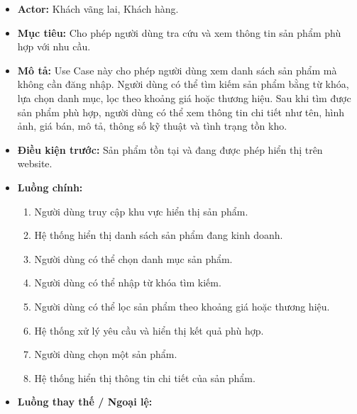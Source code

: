 \documentclass[12pt,a4paper]{article}
\begin{document}
\begin{itemize}

 \item \textbf{Actor:} Khách vãng lai, Khách hàng.

 \item \textbf{Mục tiêu:} Cho phép người dùng tra cứu và xem thông tin sản phẩm phù hợp với nhu cầu.

 \item \textbf{Mô tả:} Use Case này cho phép người dùng xem danh sách sản phẩm mà không cần đăng nhập. Người dùng có thể tìm kiếm sản phẩm bằng từ khóa, lựa chọn danh mục, lọc theo khoảng giá hoặc thương hiệu. Sau khi tìm được sản phẩm phù hợp, người dùng có thể xem thông tin chi tiết như tên, hình ảnh, giá bán, mô tả, thông số kỹ thuật và tình trạng tồn kho.

 \item \textbf{Điều kiện trước:} Sản phẩm tồn tại và đang được phép hiển thị trên website.

 \item \textbf{Luồng chính:}

 \begin{enumerate}

  \item Người dùng truy cập khu vực hiển thị sản phẩm.

  \item Hệ thống hiển thị danh sách sản phẩm đang kinh doanh.

  \item Người dùng có thể chọn danh mục sản phẩm.

  \item Người dùng có thể nhập từ khóa tìm kiếm.

  \item Người dùng có thể lọc sản phẩm theo khoảng giá hoặc thương hiệu.

  \item Hệ thống xử lý yêu cầu và hiển thị kết quả phù hợp.

  \item Người dùng chọn một sản phẩm.

  \item Hệ thống hiển thị thông tin chi tiết của sản phẩm.

 \end{enumerate}

 \item \textbf{Luồng thay thế / Ngoại lệ:}

 \begin{itemize}


\end{itemize}
\end{itemize}
\end{document}
